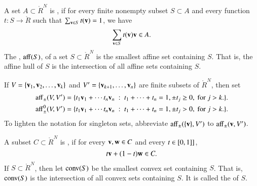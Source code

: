 \begin{definition}
A set $A\subset\ring{R}^N$ is , if for
every finite nonempty subset $S\subset A$ and every function $t:S\to\ring{R}$ such that $\sum _{{\mathbf v}\in S} t({\mathbf v})=1$, we have
\begin{displaymath}
 \sum_{\v\in S} t(\v) \v \in A.  %
\end{displaymath}
The , ${\operatorname{aff}}(S)$, of a set $S\subset\ring{R}^N$ is the smallest affine set
containing $S$. 
That is, the affine hull of $S$ is the intersection of all affine
sets containing $S$. 
\end{definition}


\begin{definition}[affine]\label{def:aff} 
  If $V = \{{\mathbf v}_1,{\mathbf v}_2,\ldots,{\mathbf v}_k\}$ and $V'=\{{\mathbf v}_{k+1},\ldots,{\mathbf v}_n\}$
  are finite subsets of $\ring{R}^N$, then set
	\begin{eqnarray*}%
\op{aff}_{\pm} (V,V') &= \{t_1 \v_1 +\cdots t_n \v_n \mid
	t_1 +\cdots+t_n = 1, \pm t_j \ge 0, \text{ for } j>k.\}.\\
\op{aff}^0_{\pm} (V,V') &= \{t_1 \v_1 +\cdots t_n \v_n \mid
	t_1 +\cdots+t_n = 1, \pm t_j > 0, \text{ for } j>k.\}.
		\end{eqnarray*}
To lighten the notation for singleton sets, abbreviate
${\operatorname{aff}}_\pm(\{{\mathbf v}\},V')$ to ${\operatorname{aff}}_\pm({\mathbf v},V')$.
%
%
%
%
%
\end{definition}



\begin{definition}
A subset $C\subset\ring{R}^N$ is , if for
every ${\mathbf v},{\mathbf w}\in C$ and every $t \in [0,1]]$,
\begin{displaymath}
t {\mathbf v} + (1-t) {\mathbf w} \in C.
\end{displaymath}
If $S\subset\ring{R}^N$, then let ${\operatorname{conv}}(S)$ be the smallest convex set
containing $S$.  That is, ${\operatorname{conv}}(S)$ is the intersection of all convex
sets containing $S$.  It is called the  of $S$.
\end{definition}

